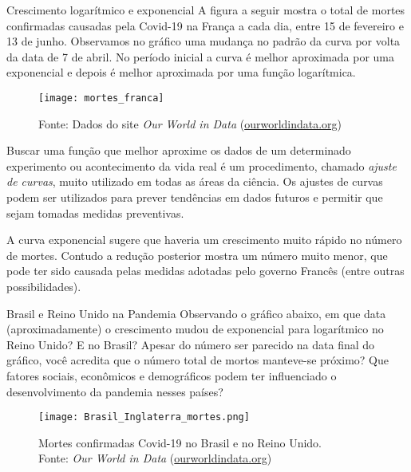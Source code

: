 \begin{example}{Crescimento logarítmico e exponencial}
A figura a seguir mostra o total de mortes confirmadas causadas pela Covid-19 na França a cada dia, entre 15 de fevereiro e 13 de junho. Observamos no gráfico uma mudança no padrão da curva por volta da data de 7 de abril. No período inicial a curva é melhor aproximada por uma exponencial e depois é melhor aproximada por uma função logarítmica.

\begin{figure}[H]
\centering

\texttt{[image: mortes\_franca]}
\caption{Fonte: Dados do site \textit{Our World in Data} (\url{ourworldindata.org})}
\end{figure}


Buscar uma função que melhor aproxime os dados de um determinado experimento ou acontecimento da vida real é um procedimento, chamado \textit{ajuste de curvas}, muito utilizado em todas as áreas da ciência. Os ajustes de curvas podem ser utilizados para prever tendências em dados futuros e permitir que sejam tomadas medidas preventivas.

A curva exponencial sugere que haveria um crescimento muito rápido no número de mortes. Contudo a redução posterior mostra um número muito menor, que pode ter sido causada pelas medidas adotadas pelo governo Francês (entre outras possibilidades).
\end{example}


\begin{task}{Brasil e Reino Unido na Pandemia}
Observando o gráfico abaixo, em que data (aproximadamente) o crescimento mudou de exponencial para logarítmico no Reino Unido? E no Brasil? Apesar do número ser parecido na data final do gráfico, você acredita que o número total de mortos manteve-se próximo? Que fatores sociais, econômicos e demográficos podem ter influenciado o desenvolvimento da pandemia nesses países? 

\begin{figure}[H]
\centering
\texttt{[image: Brasil\_Inglaterra\_mortes.png]}

\caption{Mortes confirmadas Covid-19 no Brasil e no Reino Unido. \\ Fonte: \textit{Our World in Data} (\url{ourworldindata.org})}
\end{figure}
\end{task}


\clearpage

